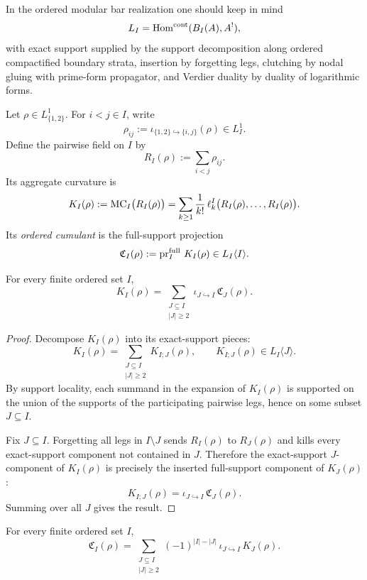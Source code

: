 \begin{remark}
In the ordered modular bar realization one should keep in mind
\[
L_I=\operatorname{Hom}^{\mathrm{cont}}(B_I(A),A^!),
\]
with exact support supplied by the support decomposition along ordered compactified boundary strata,
insertion by forgetting legs, clutching by nodal gluing with prime-form propagator, and Verdier
duality by duality of logarithmic forms.
\end{remark}

\begin{definition}
\label{def:pairwise-seed-cumulants}
Let $\rho\in L_{\{1,2\}}^1$. For $i<j\in I$, write
\[
\rho_{ij}:=\iota_{\{1,2\}\hookrightarrow\{i,j\}}(\rho)\in L_I^1.
\]
Define the pairwise field on $I$ by
\[
R_I(\rho):=\sum_{i<j}\rho_{ij}.
\]
Its aggregate curvature is
\[
K_I(\rho)
:=
\operatorname{MC}_I\!\big(R_I(\rho)\big)
=
\sum_{k\ge 1}\frac1{k!}\,\ell_k^I\big(R_I(\rho),\dots,R_I(\rho)\big).
\]
Its \emph{ordered cumulant} is the full-support projection
\[
\mathfrak C_I(\rho):=\operatorname{pr}_I^{\mathrm{full}}\,K_I(\rho)\in L_I\langle I\rangle.
\]
\end{definition}

\begin{theorem}
\label{thm:support-decomposition-of-curvature}
For every finite ordered set $I$,
\[
K_I(\rho)
=
\sum_{\substack{J\subseteq I\\ |J|\ge 2}}
\iota_{J\hookrightarrow I}\,\mathfrak C_J(\rho).
\]
\end{theorem}

\begin{proof}
Decompose $K_I(\rho)$ into its exact-support pieces:
\[
K_I(\rho)=\sum_{\substack{J\subseteq I\\ |J|\ge 2}}K_{I;J}(\rho),
\qquad
K_{I;J}(\rho)\in L_I\langle J\rangle.
\]
By support locality, each summand in the expansion of $K_I(\rho)$ is supported on the union of
the supports of the participating pairwise legs, hence on some subset $J\subseteq I$.

Fix $J\subseteq I$. Forgetting all legs in $I\setminus J$ sends $R_I(\rho)$ to $R_J(\rho)$ and kills
every exact-support component not contained in $J$. Therefore the exact-support $J$-component
of $K_I(\rho)$ is precisely the inserted full-support component of $K_J(\rho)$:
\[
K_{I;J}(\rho)=\iota_{J\hookrightarrow I}\,\mathfrak C_J(\rho).
\]
Summing over all $J$ gives the result.
\end{proof}

\begin{theorem}
\label{thm:boolean-mobius-inversion}
For every finite ordered set $I$,
\[
\mathfrak C_I(\rho)
=
\sum_{\substack{J\subseteq I\\ |J|\ge 2}}
(-1)^{|I|-|J|}
\,\iota_{J\hookrightarrow I}\,K_J(\rho).
\]
\end{theorem}

